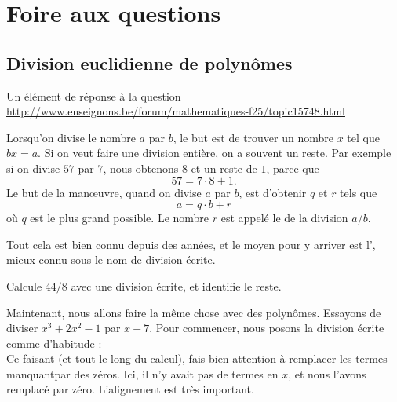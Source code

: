 

%
   \section{Foire aux questions}
%

					\subsection{Division euclidienne de polynômes}

Un élément de réponse à la question\\
\url{http://www.enseignons.be/forum/mathematiques-f25/topic15748.html}

\vspace{1cm}

Lorsqu'on divise le nombre $a$ par $b$, le but est de trouver un nombre $x$ tel que $bx=a$. Si on veut faire une division entière, on a souvent un reste. Par exemple si on divise $57$ par $7$, nous obtenons $8$ et un reste de $1$, parce que
\begin{equation}
	57=7\cdot 8 +1.
\end{equation}
Le but de la man\oe uvre, quand on divise $a$ par $b$, est d'obtenir $q$ et $r$ tels que
\begin{equation}
	a = q\cdot b+r
\end{equation}
où $q$ est le plus grand possible. Le nombre $r$ est appelé le  de la division $a/b$.

Tout cela est bien connu depuis des années, et le moyen pour y arriver est l', mieux connu sous le nom de \og division écrite\fg{}.

\begin{exercice}
Calcule $44/8$ avec une division écrite, et identifie le reste.
\end{exercice}

Maintenant, nous allons faire la même chose avec des polynômes. Essayons de diviser $x^3+2x^2-1$ par $x+7$. Pour commencer, nous posons la division écrite comme d'habitude :
\begin{equation}
	
\end{equation}
Ce faisant (et tout le long du calcul), fais bien attention à remplacer les termes \og manquant\fg par des zéros. Ici, il n'y avait pas de termes en $x$, et nous l'avons remplacé par zéro. L'alignement est très important.


